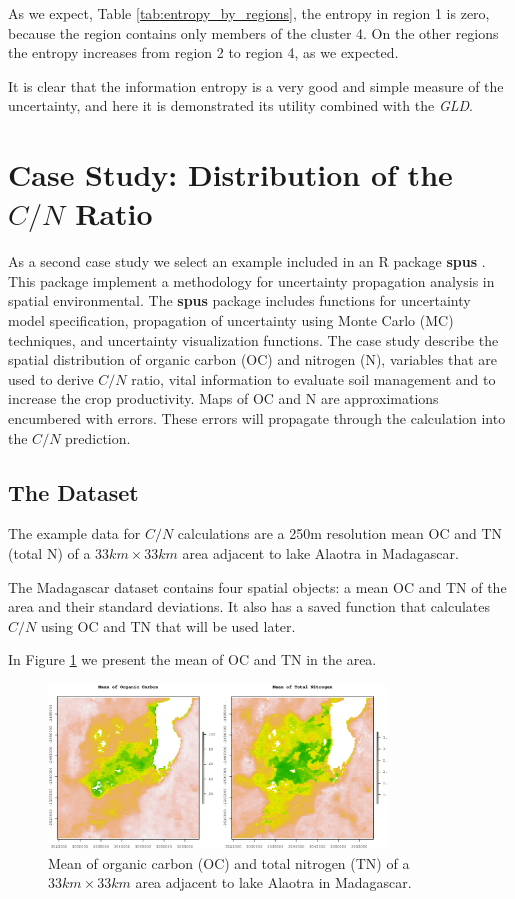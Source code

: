 As we expect, Table \ref{tab:entropy_by_regions}, the entropy in region 1 is zero, because the region contains only members of the cluster 4. On the other regions the entropy increases from region 2 to region 4, as we expected.

It is clear that the information entropy is a very good and simple measure of the uncertainty, and here it is demonstrated its utility combined with the \textit{GLD}.


\section{Case Study: Distribution of the $C/N$ Ratio}\label{sec:enviromental}
As a second case study we select an example included in an R package \textbf{spus} \cite{Sawicka2016}. This package implement a methodology for uncertainty propagation analysis in spatial environmental. The \textbf{spus} package includes functions for uncertainty model specification, propagation of uncertainty using Monte Carlo (MC) techniques, and uncertainty visualization functions.
The case study describe the spatial distribution of organic carbon (OC) and nitrogen (N), variables that are used to derive $C/N$ ratio, vital information to evaluate soil management and to increase the crop productivity. Maps of OC and N are approximations encumbered with errors. These errors will propagate through the calculation into the $C/N$ prediction.

\subsection{The Dataset}
The example data for $C/N$ calculations are a 250m resolution mean OC and TN (total N) of a $33km \times 33km$ area adjacent to lake Alaotra in Madagascar.

The Madagascar dataset contains four spatial objects: a mean OC and TN of the area and their standard deviations. It also has a saved function that calculates $C/N$ using OC and TN that will be used later.

In Figure \ref{fig:mean_oc_tn} we present the mean of OC and TN in the area.

\begin{figure}[H]
    \centering
    \includegraphics[width=0.8\textwidth]{img/use_cases/spus/dataset_example.eps}
    \caption{Mean of organic carbon (OC) and total nitrogen (TN) of a $33km \times 33km$ area adjacent to lake Alaotra in Madagascar.}
    \label{fig:mean_oc_tn}
\end{figure}


